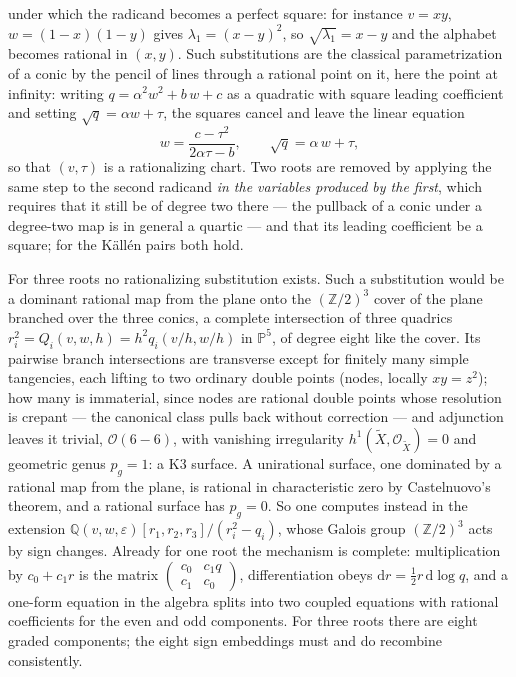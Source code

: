 \documentclass[11pt]{article}
\newcommand{\eps}{\varepsilon}
\newcommand{\dd}{\mathrm{d}}
\newcommand{\Q}{\mathbb{Q}}
\newcommand{\Z}{\mathbb{Z}}
\begin{document}
under which the radicand becomes a perfect square: for instance
$v = xy$, $w = (1-x)(1-y)$ gives $\lambda_1 = (x-y)^2$, so
$\sqrt{\lambda_1} = x-y$ and the alphabet becomes rational in
$(x,y)$.  Such substitutions are the classical parametrization of a
conic by the pencil of lines through a rational point on it, here the
point at infinity: writing $q = \alpha^2 w^2 + b\,w + c$ as a
quadratic with square leading coefficient and setting
$\sqrt q = \alpha w + \tau$, the squares cancel and leave the linear
equation
\begin{equation}
  w = \frac{c - \tau^2}{2\alpha\tau - b} ,
  \qquad \sqrt q = \alpha\,w + \tau ,
\end{equation}
so that $(v,\tau)$ is a rationalizing chart.  Two roots are removed
by applying the same step to the second radicand \emph{in the
variables produced by the first}, which requires that it still be of
degree two there --- the pullback of a conic under a degree-two map
is in general a quartic --- and that its leading coefficient be a
square; for the K\"all\'en pairs both hold.

For three roots no rationalizing substitution exists.  Such a
substitution would be a dominant rational map from the plane onto the
$(\Z/2)^3$ cover of the plane branched over the three conics, a
complete intersection of three quadrics
$r_i^2 = Q_i(v,w,h) = h^2q_i(v/h,w/h)$ in $\mathbb{P}^5$, of degree
eight like the cover.  Its pairwise branch intersections are
transverse except for finitely many simple tangencies, each lifting to
two ordinary double points (nodes, locally $xy = z^2$); how many is
immaterial, since nodes are rational double points whose resolution is
crepant --- the canonical class pulls back without correction --- and
adjunction leaves it trivial, $\mathcal{O}(6-6)$, with vanishing
irregularity $h^1(\widetilde X, \mathcal{O}_{\widetilde X}) = 0$ and
geometric genus $p_g=1$: a K3 surface.  A unirational
surface, one dominated by a rational map from the plane, is rational
in characteristic zero by Castelnuovo's theorem, and a rational
surface has $p_g = 0$.  So one computes
instead in the extension $\Q(v,w,\eps)[r_1,r_2,r_3]/(r_i^2-q_i)$,
whose Galois group $(\Z/2)^3$ acts by sign changes.  Already for one
root the mechanism is complete: multiplication by $c_0 + c_1 r$ is
the matrix $\left(\begin{smallmatrix} c_0 & c_1q\\ c_1 & c_0
\end{smallmatrix}\right)$, differentiation obeys
$\dd r = \tfrac12 r\,\dd\log q$, and a one-form equation in the
algebra splits into two coupled equations with rational coefficients
for the even and odd components.  For three roots there are eight
graded components; the eight sign embeddings must and do recombine
consistently.
\end{document}
